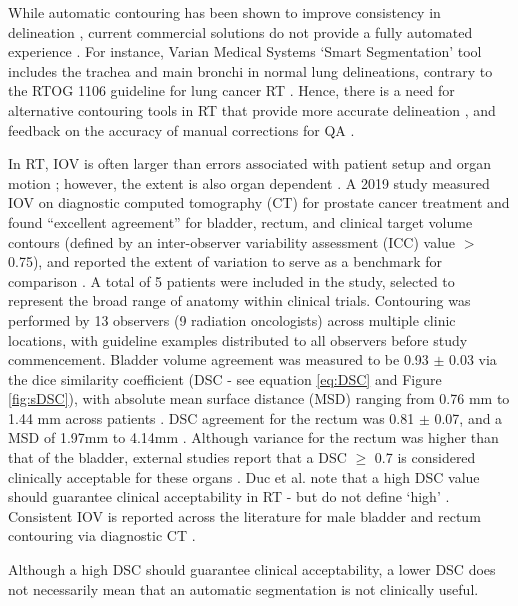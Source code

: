 While automatic contouring has been shown to improve consistency in delineation \cite{Vinod_2016}, current commercial solutions do not provide a fully automated experience \cite{Nemoto_2020}. For instance, Varian Medical Systems `Smart Segmentation' tool includes the trachea and main bronchi in normal lung delineations, contrary to the RTOG 1106 guideline for lung cancer RT \cite{Nemoto_2020}. Hence, there is a need for alternative contouring tools in RT that provide more accurate delineation \cite{Nemoto_2020}, and feedback on the accuracy of manual corrections for QA \cite{Nikolov_2018}.

In RT, IOV is often larger than errors associated with patient setup and organ motion \cite{Vinod_2016, Murakami2013}; however, the extent is also organ dependent \cite{Roach_2019}. A 2019 study measured IOV on diagnostic computed tomography (CT) for prostate cancer treatment and found ``excellent agreement'' for bladder, rectum, and clinical target volume contours (defined by an inter-observer variability assessment (ICC) value $>$ 0.75), and reported the extent of variation to serve as a benchmark for comparison \cite{Roach_2019}.  A total of 5 patients were included in the study, selected to represent the broad range of anatomy within clinical trials. Contouring was performed by 13  observers (9 radiation oncologists) across multiple clinic locations, with guideline examples distributed to all observers before study commencement. Bladder volume agreement was measured to be 0.93 $\pm$ 0.03 via the dice similarity coefficient (DSC \cite{Dice1945} - see equation \ref{eq:DSC} and Figure \ref{fig:sDSC}), with absolute mean surface distance (MSD) ranging from 0.76 mm to 1.44 mm across patients \cite{Roach_2019}. DSC agreement for the rectum was  0.81 $\pm$ 0.07, and a MSD of 1.97mm to 4.14mm \cite{Roach_2019}. Although variance for the rectum was higher than that of the bladder, external studies report that a DSC $\geq$ 0.7 is considered clinically acceptable for these organs \cite{Roach_2019, Sharp2014}. Duc et al. note that a high DSC value should guarantee clinical acceptability in RT - but do not define `high' \cite{Duc}. Consistent IOV is reported across the literature for male bladder and rectum contouring via diagnostic CT \cite{Riegal2016}.

Although a high DSC should guarantee clinical acceptability, a lower DSC does not necessarily mean that an automatic segmentation is not clinically useful.

